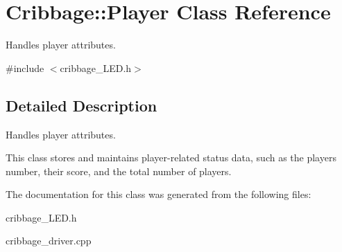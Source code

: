 \hypertarget{class_cribbage_1_1_player}{}\section{Cribbage\+:\+:Player Class Reference}
\label{class_cribbage_1_1_player}


Handles player attributes.  




{\ttfamily \#include $<$cribbage\+\_\+\+L\+E\+D.\+h$>$}



\subsection{Detailed Description}
Handles player attributes. 

This class stores and maintains player-\/related status data, such as the player\textquotesingle{}s number, their score, and the total number of players. 

The documentation for this class was generated from the following files\+:\begin{DoxyCompactItemize}
\item 
cribbage\+\_\+\+L\+E\+D.\+h\item 
cribbage\+\_\+driver.\+cpp\end{DoxyCompactItemize}
